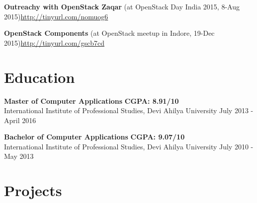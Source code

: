\documentclass[margin,line]{resume}
\begin{document}
\begin{resume}
    \begin{list2}
    \item \textbf{Outreachy with OpenStack Zaqar} (at OpenStack Day India 2015, 8-Aug 2015)\url{http://tinyurl.com/nomuog6}
    \end{list2}

    \begin{list2}
    \item \textbf{OpenStack Components} (at OpenStack meetup in Indore, 19-Dec 2015)\url{http://tinyurl.com/gscb7cd}
    \end{list2}

    \section{\mysidestyle Education}

    \begin{list2}
	\item \textbf{Master of Computer Applications} \hspace{70mm} \textbf{CGPA: 8.91/10} \\ International Institute of Professional Studies, Devi Ahilya University \hspace{17mm} July 2013 - April 2016
	\end{list2}

	\begin{list2}
	\item \textbf{Bachelor of Computer Applications} \hspace{70mm} \textbf{CGPA: 9.07/10} \\ International Institute of Professional Studies, Devi Ahilya University \hspace{20mm} July 2010 - May 2013
	\end{list2}

    \section{\mysidestyle Projects} 
	\begin{list2}


\end{list2}
\end{resume}
\end{document}
